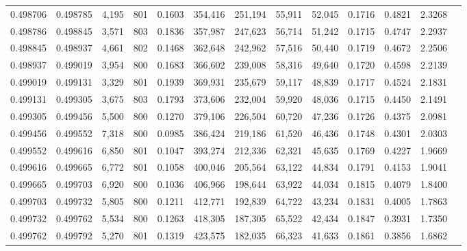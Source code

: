 \begin{tabular}{rrrrrrrrrrrrr}
0.498706 & 0.498785 & 4,195 & 801 &                                     0.1603 & 354,416 & 251,194 &  55,911 &  52,045 & 0.1716 & 0.4821 & 2.3268 \\
0.498786 & 0.498845 & 3,571 & 803 &                                     0.1836 & 357,987 & 247,623 &  56,714 &  51,242 & 0.1715 & 0.4747 & 2.2937 \\
0.498845 & 0.498937 & 4,661 & 802 &                                     0.1468 & 362,648 & 242,962 &  57,516 &  50,440 & 0.1719 & 0.4672 & 2.2506 \\
0.498937 & 0.499019 & 3,954 & 800 &                                     0.1683 & 366,602 & 239,008 &  58,316 &  49,640 & 0.1720 & 0.4598 & 2.2139 \\
0.499019 & 0.499131 & 3,329 & 801 &                                     0.1939 & 369,931 & 235,679 &  59,117 &  48,839 & 0.1717 & 0.4524 & 2.1831 \\
0.499131 & 0.499305 & 3,675 & 803 &                                     0.1793 & 373,606 & 232,004 &  59,920 &  48,036 & 0.1715 & 0.4450 & 2.1491 \\
0.499305 & 0.499456 & 5,500 & 800 &                                     0.1270 & 379,106 & 226,504 &  60,720 &  47,236 & 0.1726 & 0.4375 & 2.0981 \\
0.499456 & 0.499552 & 7,318 & 800 &                                     0.0985 & 386,424 & 219,186 &  61,520 &  46,436 & 0.1748 & 0.4301 & 2.0303 \\
0.499552 & 0.499616 & 6,850 & 801 &                                     0.1047 & 393,274 & 212,336 &  62,321 &  45,635 & 0.1769 & 0.4227 & 1.9669 \\
0.499616 & 0.499665 & 6,772 & 801 &                                     0.1058 & 400,046 & 205,564 &  63,122 &  44,834 & 0.1791 & 0.4153 & 1.9041 \\
0.499665 & 0.499703 & 6,920 & 800 &                                     0.1036 & 406,966 & 198,644 &  63,922 &  44,034 & 0.1815 & 0.4079 & 1.8400 \\
0.499703 & 0.499732 & 5,805 & 800 &                                     0.1211 & 412,771 & 192,839 &  64,722 &  43,234 & 0.1831 & 0.4005 & 1.7863 \\
0.499732 & 0.499762 & 5,534 & 800 &                                     0.1263 & 418,305 & 187,305 &  65,522 &  42,434 & 0.1847 & 0.3931 & 1.7350 \\
0.499762 & 0.499792 & 5,270 & 801 &                                     0.1319 & 423,575 & 182,035 &  66,323 &  41,633 & 0.1861 & 0.3856 & 1.6862 \\

\end{tabular}
